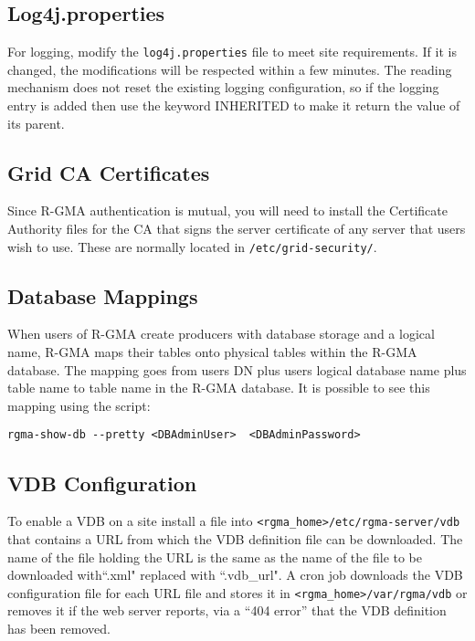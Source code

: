\subsection{Log4j.properties}
For logging, modify the \texttt{log4j.properties} file to meet site
requirements.  If it is changed, the modifications will be respected
within a few minutes. The reading mechanism does not reset the
existing logging configuration, so if the logging entry is added then
use the keyword INHERITED to make it return the value of its parent.

\subsection{Grid CA Certificates}
Since R-GMA authentication is mutual, you will need to install the
Certificate Authority files for the CA that signs the server
certificate of any server that users wish to use. These are normally
located in \texttt{/etc/grid-security/}.

\subsection{Database Mappings}
\label{sec:dbMapping}
When users of R-GMA create producers with database storage and a
logical name, R-GMA maps their tables onto physical tables within the
R-GMA database. The mapping goes from users DN plus users logical
database name plus table name to table name in the R-GMA database. It
is possible to see this mapping using the script:

\begin{verbatim}
rgma-show-db --pretty <DBAdminUser>  <DBAdminPassword>
\end{verbatim}

\subsection{VDB Configuration}
\label{sec:vdbConf}
To enable a VDB on a site install a file into
\verb!<rgma_home>!\texttt{/etc/rgma-server/vdb} that contains a URL
from which the VDB definition file can be downloaded. The name of the
file holding the URL is the same as the name of the file to be
downloaded with``.xml" replaced with ``.vdb\_url". A cron job
downloads the VDB configuration file for each URL file and stores it
in \verb!<rgma_home>!\texttt{/var/rgma/vdb} or removes it if the web
server reports, via a ``404 error'' that the VDB definition has been
removed.


